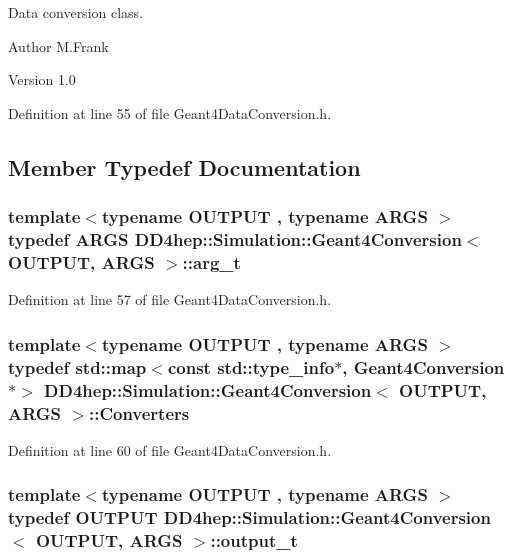 Data conversion class. \begin{DoxyAuthor}{Author}
M.Frank 
\end{DoxyAuthor}
\begin{DoxyVersion}{Version}
1.0 
\end{DoxyVersion}


Definition at line 55 of file Geant4DataConversion.h.

\subsection{Member Typedef Documentation}
\hypertarget{class_d_d4hep_1_1_simulation_1_1_geant4_conversion_a2a9680db46d2a136982d290c9b11e6f8}{
\subsubsection[{arg\_\-t}]{\setlength{\rightskip}{0pt plus 5cm}template$<$typename OUTPUT , typename ARGS $>$ typedef ARGS {\bf DD4hep::Simulation::Geant4Conversion}$<$ OUTPUT, ARGS $>$::{\bf arg\_\-t}}}
\label{class_d_d4hep_1_1_simulation_1_1_geant4_conversion_a2a9680db46d2a136982d290c9b11e6f8}


Definition at line 57 of file Geant4DataConversion.h.\hypertarget{class_d_d4hep_1_1_simulation_1_1_geant4_conversion_a1e6c074730135cc207cbd8d8030a189f}{
\subsubsection[{Converters}]{\setlength{\rightskip}{0pt plus 5cm}template$<$typename OUTPUT , typename ARGS $>$ typedef std::map$<$const std::type\_\-info$\ast$, {\bf Geant4Conversion}$\ast$$>$ {\bf DD4hep::Simulation::Geant4Conversion}$<$ OUTPUT, ARGS $>$::{\bf Converters}}}
\label{class_d_d4hep_1_1_simulation_1_1_geant4_conversion_a1e6c074730135cc207cbd8d8030a189f}


Definition at line 60 of file Geant4DataConversion.h.\hypertarget{class_d_d4hep_1_1_simulation_1_1_geant4_conversion_a9a6bd3ad991e9d1f61751201d4307d4a}{
\subsubsection[{output\_\-t}]{\setlength{\rightskip}{0pt plus 5cm}template$<$typename OUTPUT , typename ARGS $>$ typedef OUTPUT {\bf DD4hep::Simulation::Geant4Conversion}$<$ OUTPUT, ARGS $>$::{\bf output\_\-t}}}
\label{class_d_d4hep_1_1_simulation_1_1_geant4_conversion_a9a6bd3ad991e9d1f61751201d4307d4a}


